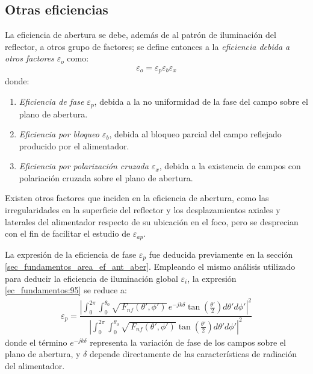 \subsection{Otras eficiencias}
\label{subsec_principios_otras_efi}

La eficiencia de abertura se debe, además de al patrón de iluminación del reflector, a otros grupo de factores; se define entonces a la \emph{eficiencia debida a otros factores} $\varepsilon_o$ como:
\begin{align*}
\varepsilon_o = \varepsilon_p\varepsilon_b\varepsilon_x
\end{align*}
donde:
\begin{enumerate}
\item \emph{Eficiencia de fase $\varepsilon_p$}, debida a la no uniformidad de la fase del campo sobre el plano de abertura.
\item \emph{Eficiencia por bloqueo $\varepsilon_b$}, debida al bloqueo parcial del campo reflejado producido por el alimentador.
\item \emph{Eficiencia por polarización cruzada $\varepsilon_x$}, debida a la existencia de campos con polariación cruzada sobre el plano de abertura.
\end{enumerate}
Existen otros factores que inciden en la eficiencia de abertura, como las irregularidades en la superficie del reflector y los desplazamientos axiales y laterales del alimentador respecto de su ubicación en el foco, pero se desprecian con el fin de facilitar el estudio de $\varepsilon_{ap}$.

La expresión de la eficiencia de fase $\varepsilon_p$ fue deducida previamente en la sección \ref{sec_fundamentos_area_ef_ant_aber}. Empleando el mismo análisis utilizado para deducir la eficiencia de iluminación global $\varepsilon_i$, la expresión \eqref{ec_fundamentos:95} se reduce a:
\begin{align}
\varepsilon_p  = \dfrac{\left|\displaystyle\int_0^{2\pi}\!\!\!\int_0^{\theta_0}\! \sqrt{\,F_{nf}\left(\theta ',\phi '\right)}\,e^{-jk\delta}\tan\left(\frac{\theta '}{2}\right)\!d\theta 'd\phi '\right|^2}{\left|\displaystyle\int_0^{2\pi}\!\!\!\int_0^{\theta_0}\! \sqrt{\,F_{nf}\left(\theta ',\phi '\right)}\tan\left(\frac{\theta '}{2}\right)\!d\theta 'd\phi '\right|^2}
\label{ec_principios:87}
\end{align}
donde el término $e^{-jk\delta}$ representa la variación de fase de los campos sobre el plano de abertura, y $\delta$ depende directamente de las características de radiación del alimentador.


